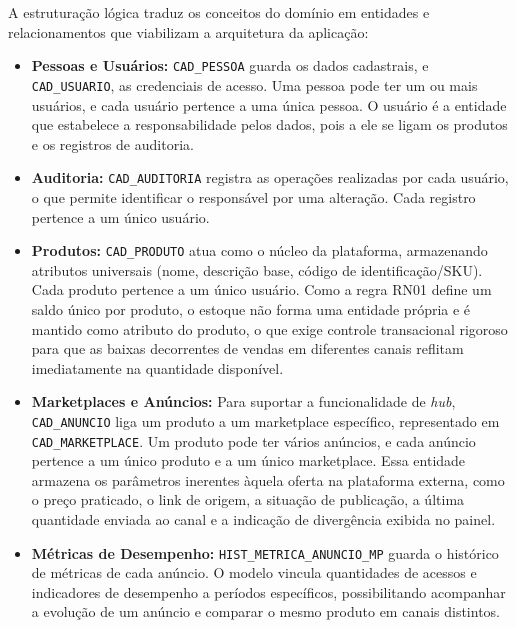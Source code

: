 A estruturação lógica traduz os conceitos do domínio em entidades e relacionamentos que viabilizam a arquitetura da aplicação:

\begin{itemize}
    \item \textbf{Pessoas e Usuários:} \texttt{CAD\_PESSOA} guarda os dados cadastrais, e \texttt{CAD\_USUARIO}, as credenciais de acesso. Uma pessoa pode ter um ou mais usuários, e cada usuário pertence a uma única pessoa. O usuário é a entidade que estabelece a responsabilidade pelos dados, pois a ele se ligam os produtos e os registros de auditoria.

    \item \textbf{Auditoria:} \texttt{CAD\_AUDITORIA} registra as operações realizadas por cada usuário, o que permite identificar o responsável por uma alteração. Cada registro pertence a um único usuário.

    \item \textbf{Produtos:} \texttt{CAD\_PRODUTO} atua como o núcleo da plataforma, armazenando atributos universais (nome, descrição base, código de identificação/SKU). Cada produto pertence a um único usuário. Como a regra RN01 define um saldo único por produto, o estoque não forma uma entidade própria e é mantido como atributo do produto, o que exige controle transacional rigoroso para que as baixas decorrentes de vendas em diferentes canais reflitam imediatamente na quantidade disponível.

    \item \textbf{Marketplaces e Anúncios:} Para suportar a funcionalidade de \textit{hub}, \texttt{CAD\_ANUNCIO} liga um produto a um marketplace específico, representado em \texttt{CAD\_MARKETPLACE}. Um produto pode ter vários anúncios, e cada anúncio pertence a um único produto e a um único marketplace. Essa entidade armazena os parâmetros inerentes àquela oferta na plataforma externa, como o preço praticado, o link de origem, a situação de publicação, a última quantidade enviada ao canal e a indicação de divergência exibida no painel.

    \item \textbf{Métricas de Desempenho:} \texttt{HIST\_METRICA\_ANUNCIO\_MP} guarda o histórico de métricas de cada anúncio. O modelo vincula quantidades de acessos e indicadores de desempenho a períodos específicos, possibilitando acompanhar a evolução de um anúncio e comparar o mesmo produto em canais distintos.
\end{itemize}

